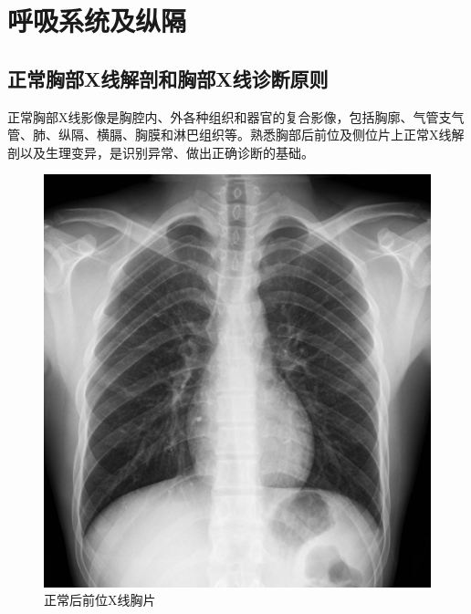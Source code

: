 \chapter{呼吸系统及纵隔}

\section{正常胸部X线解剖和胸部X线诊断原则}

正常胸部X线影像是胸腔内、外各种组织和器官的复合影像，包括胸廓、气管支气管、肺、纵隔、横膈、胸膜和淋巴组织等。熟悉胸部后前位及侧位片上正常X线解剖以及生理变异，是识别异常、做出正确诊断的基础。

\begin{figure}[!htbp]
 \centering
 \includegraphics{./images/Image00129.jpg}
 \captionsetup{justification=centering}
 \caption{正常后前位X线胸片}
 \label{fig3-1-1}
  \end{figure} 

